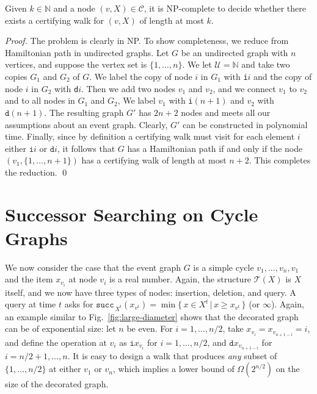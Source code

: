 \documentclass[oribibl,envcountsect,envcountsame]{llncs}
\newcommand{\C}{\mathcal C}
\newcommand{\U}{\mathcal U}
\newcommand{\N}{\mathbb N}
\begin{document}
\begin{lemma}
Given  $k \in \N$ and a node $(v, X) \in \C$, it is \textup{NP}-complete to 
decide whether there exists a certifying walk for $(v,X)$ of length at most $k$.
\end{lemma}

\begin{proof}
The problem is clearly in NP.
To show completeness, we reduce from  Hamiltonian path
in undirected graphs. Let $G$ be an undirected graph with $n$ vertices,
and suppose the vertex set is $\{1, \dots, n\}$. We let $\U = \N$ and take
two copies $G_1$ and $G_2$ of $G$. We label the copy of node $i$ in 
$G_1$ with \texttt{i}$i$ and the copy of node $i$ in $G_2$ with 
\texttt{d}$i$. Then we add two nodes $v_1$ and $v_2$, and we connect
 $v_1$ to $v_2$ and 
to all nodes in $G_1$ and $G_2$, We label $v_1$ with \texttt{i}$(n+1)$
and $v_2$ with $\texttt{d}(n+1)$. The resulting graph $G'$ has $2n+2$
nodes and meets all our assumptions about an event graph.
Clearly, $G'$ can be constructed in polynomial time.
Finally, since by definition a certifying walk must visit for
each element $i$ either $\texttt{i}i$ or $\texttt{d}i$, it follows that
$G$ has a Hamiltonian path if and only if the
node $(v_1, \{1, \dots, n+1\})$ has a certifying walk of length
at most $n+2$. This completes the reduction.
\qed\end{proof}

\section{Successor Searching on Cycle Graphs}\label{1D}

We now consider the case that the 
event graph $G$ is a simple cycle $v_1,\dots, v_{n},v_1$ and 
the item $x_{v_i}$ at node $v_i$ is a real number.
Again, the structure $\mathcal{T}(X)$ is $X$ itself,
and we now have three types of nodes: 
insertion, deletion, and query.
A query at time $t$ asks for 
$\texttt{succ}_{\,X^t}(x_{v^t})= \min\{\,x\in X^t\,|\, x\geq x_{v^t}\,\}$
(or $\infty$).
Again, an example similar to Fig.~\ref{fig:large-diameter}
shows that the decorated graph can be
of exponential size: let $n$ be even. For $i = 1, \dots, n/2 $, 
take $x_{v_i} = x_{v_{n+1-i}} = i$,
and define the operation at $v_i$ as
$\texttt{i}x_{v_i}$ for $i = 1, \dots, n/2$,
and $\texttt{d}x_{v_{n+1-i}}$ for $i = n/2 +1, \dots, n$.
It is easy to design a walk
that produces \emph{any} subset
of $\{1, \dots, n/2\}$ at either $v_1$ or $v_n$,
which 
implies a lower bound of $\Omega( 2^{n/2} )$ on
the size of the decorated graph.
\end{document}
